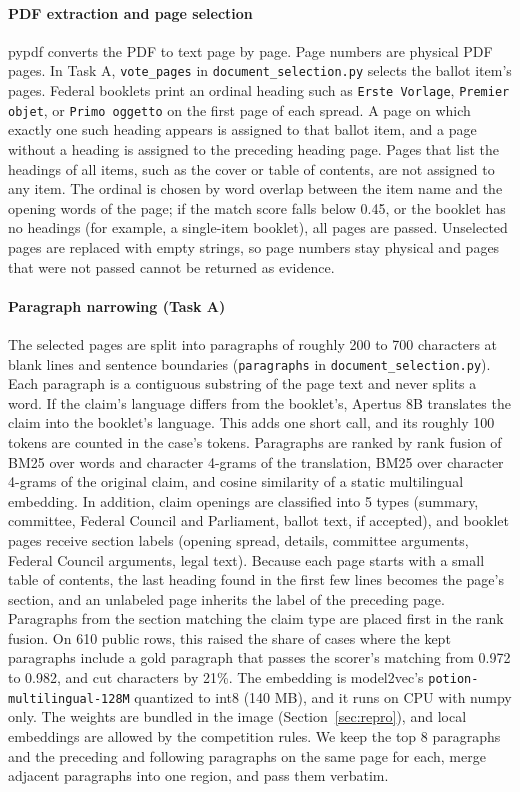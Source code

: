 \documentclass[10pt,a4paper]{article}
\begin{document}
\paragraph{PDF extraction and page selection}
pypdf\cite{pypdf} converts the PDF to text page by page. Page numbers are physical PDF pages.
In Task A, \texttt{vote\_pages} in \texttt{document\_selection.py} selects the ballot item's pages.
Federal booklets print an ordinal heading such as \texttt{Erste Vorlage}, \texttt{Premier objet}, or \texttt{Primo oggetto} on the first page of each spread.
A page on which exactly one such heading appears is assigned to that ballot item, and a page without a heading is assigned to the preceding heading page.
Pages that list the headings of all items, such as the cover or table of contents, are not assigned to any item.
The ordinal is chosen by word overlap between the item name and the opening words of the page; if the match score falls below 0.45, or the booklet has no headings (for example, a single-item booklet), all pages are passed.
Unselected pages are replaced with empty strings, so page numbers stay physical and pages that were not passed cannot be returned as evidence.

\paragraph{Paragraph narrowing (Task A)}
The selected pages are split into paragraphs of roughly 200 to 700 characters at blank lines and sentence boundaries (\texttt{paragraphs} in \texttt{document\_selection.py}).
Each paragraph is a contiguous substring of the page text and never splits a word.
If the claim's language differs from the booklet's, Apertus 8B\cite{apertus8b} translates the claim into the booklet's language. This adds one short call, and its roughly 100 tokens are counted in the case's tokens.
Paragraphs are ranked by rank fusion of BM25\cite{robertson2009bm25} over words and character 4-grams of the translation, BM25 over character 4-grams of the original claim, and cosine similarity of a static multilingual embedding.
In addition, claim openings are classified into 5 types (summary, committee, Federal Council and Parliament, ballot text, if accepted), and booklet pages receive section labels (opening spread, details, committee arguments, Federal Council arguments, legal text).
Because each page starts with a small table of contents, the last heading found in the first few lines becomes the page's section, and an unlabeled page inherits the label of the preceding page.
Paragraphs from the section matching the claim type are placed first in the rank fusion.
On 610 public rows, this raised the share of cases where the kept paragraphs include a gold paragraph that passes the scorer's matching from 0.972 to 0.982, and cut characters by 21\%.
The embedding is model2vec's \texttt{potion-multilingual-128M} quantized to int8 (140 MB), and it runs on CPU with numpy only. The weights are bundled in the image (Section~\ref{sec:repro}), and local embeddings are allowed by the competition rules.
We keep the top 8 paragraphs and the preceding and following paragraphs on the same page for each, merge adjacent paragraphs into one region, and pass them verbatim.
\end{document}

